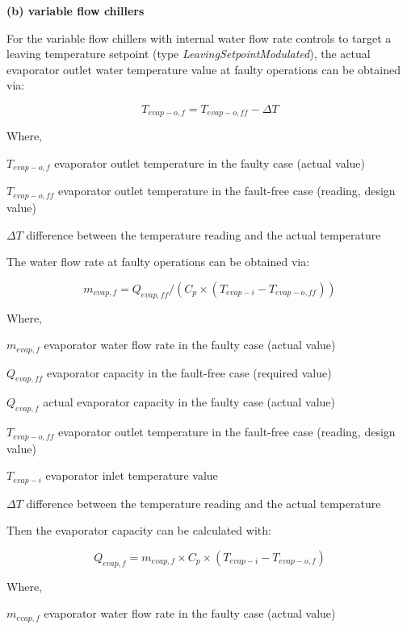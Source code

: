 \newline \newline

\textbf{(b) variable flow chillers}

For the variable flow chillers with internal water flow rate controls to target a leaving temperature setpoint (type \emph{LeavingSetpointModulated}), the actual evaporator outlet water temperature value at faulty operations can be obtained via:

\begin{equation}
T_{evap-o,f} = T_{evap-o,ff} - \Delta T
\end{equation}

Where, 

\(T_{evap-o,f}\) evaporator outlet temperature in the faulty case (actual value)

\(T_{evap-o,ff}\) evaporator outlet temperature in the fault-free case (reading, design value)

\(\Delta T\) difference between the temperature reading and the actual temperature

The water flow rate at faulty operations can be obtained via:

\begin{equation}
m_{evap,f} = Q_{evap,ff} / ( C_p \times (T_{evap-i} - T_{evap-o,ff} ) )
\end{equation}

Where, 

\(m_{evap,f}\) evaporator water flow rate in the faulty case (actual value)

\(Q_{evap,ff}\) evaporator capacity in the fault-free case (required value)

\(Q_{evap,f}\) actual evaporator capacity in the faulty case (actual value)

\(T_{evap-o,ff}\) evaporator outlet temperature in the fault-free case (reading, design value)

\(T_{evap-i}\) evaporator inlet temperature value 

\(\Delta T\) difference between the temperature reading and the actual temperature

Then the evaporator capacity can be calculated with:

\begin{equation}
Q_{evap,f} = m_{evap,f} \times C_p \times (T_{evap-i} - T_{evap-o,f} )
\end{equation}

Where, 

\(m_{evap,f}\) evaporator water flow rate in the faulty case (actual value)

